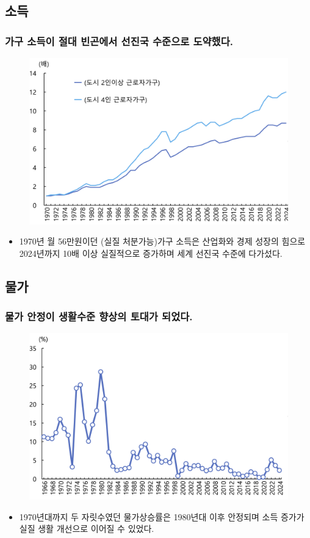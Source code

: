 \documentclass[aspectratio=169,xcolor=dvipsnames,handout]{beamer}
\begin{document}
\subsection{소득}
\begin{frame}[<+->]
\frametitle{가구 소득이 절대 빈곤에서 선진국 수준으로 도약했다.}
    \begin{figure}
        \centering
        \includegraphics[width=.5\textwidth]{pic/fig_ineq_01.png}
    \end{figure}
    \begin{itemize}
        \item 1970년 월 56만원이던 (실질 처분가능)가구 소득은 산업화와 경제 성장의 힘으로 2024년까지 10배 이상 실질적으로 증가하며 세계 선진국 수준에 다가섰다.
    \end{itemize}
\end{frame}

\subsection{물가}
\begin{frame}[<+->]
\frametitle{물가 안정이 생활수준 향상의 토대가 되었다.}
    \begin{figure}
        \centering
        \includegraphics[width=.5\textwidth]{pic/fig_ineq_02.png}
    \end{figure}
    \begin{itemize}
        \item 1970년대까지 두 자릿수였던 물가상승률은 1980년대 이후 안정되며 소득 증가가 실질 생활 개선으로 이어질 수 있었다.
    \end{itemize}
\end{frame}
\end{document}
